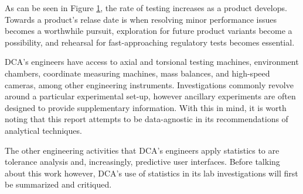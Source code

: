 \documentclass[11pt,a4paper,article]{memoir} %
\begin{document}
\par
As can be seen in Figure \ref{fig:time_of_tests}, the rate of testing increases as a product develops. Towards a product's relase date is when resolving minor performance issues becomes a worthwhile pursuit, exploration for future product variants become a possibility, and rehearsal for fast-approaching regulatory tests becomes essential.
\begin{figure}
\label{fig:time_of_tests}
\end{figure}
\par
DCA's engineers have access to axial and torsional testing machines, environment chambers, coordinate measuring machines, mass balances, and high-speed cameras, among other engineering instruments. Investigations commonly revolve around a particular experimental set-up, however ancillary experiments are often designed to provide supplementary information. With this in mind, it is worth noting that this report attempts to be data-agnostic in its recommendations of analytical techniques.
\par
The other engineering activities that DCA's engineers apply statistics to are tolerance analysis and, increasingly, predictive user interfaces. Before talking about this work however, DCA's use of statistics in its lab investigations will first be summarized and critiqued.

\end{document}

